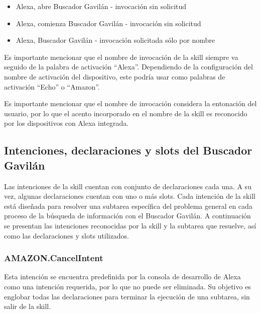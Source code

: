 \begin{itemize}
  \item Alexa, abre Buscador Gavilán - invocación sin solicitud
  \item Alexa, comienza Buscador Gavilán - invocación sin solicitud
  \item Alexa, Buscador Gavilán - invocación solicitada sólo por nombre
\end{itemize}

Es importante mencionar que el nombre de invocación de la skill siempre va seguido de la palabra de activación “Alexa”. Dependiendo de la configuración del nombre de activación del dispositivo, este podría usar como palabras de activación “Echo” o “Amazon”.

Es importante mencionar que el nombre de invocación considera la entonación del usuario, por lo que el acento incorporado en el nombre de la skill es reconocido por los dispositivos con Alexa integrada.


\subsection{Intenciones, declaraciones y slots del Buscador Gavilán}
\label{IntencionesDeclaracionesSlotscapIV}

Las intenciones de la skill cuentan con conjunto de declaraciones cada una. A su vez, algunas declaraciones cuentan con uno o más slots. Cada intención de la skill está diseñada para resolver una subtarea específica del problema general en cada proceso de la búsqueda de información con el Buscador Gavilán. A continuación se presentan las intenciones reconocidas por la skill y la subtarea que resuelve, así como las declaraciones y slots utilizados.


\subsubsection{AMAZON.CancelIntent}
\label{CancelIntentcapIV}

Esta intención se encuentra predefinida por la consola de desarrollo de Alexa como una intención requerida, por lo que no puede ser eliminada. Su objetivo es englobar todas las declaraciones para terminar la ejecución de una subtarea, sin salir de la skill.

